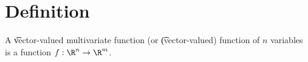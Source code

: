 

\section*{Definition}

A \t{vector-valued multivariate function} (or \t{(vector-valued) function of $n$ variables} is a function $f: \R ^n \to \R ^m$.

\blankpage